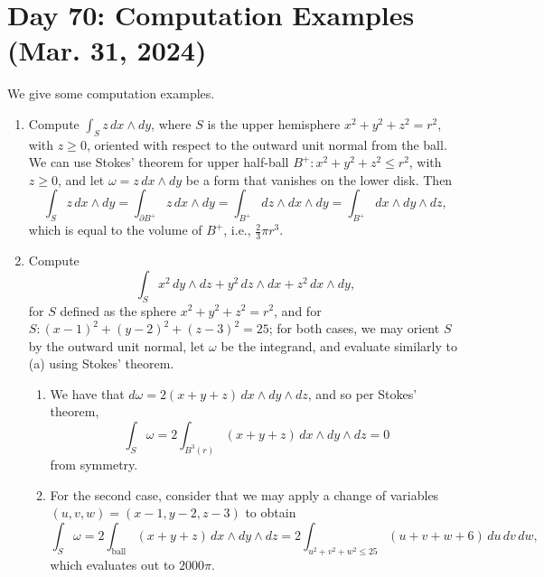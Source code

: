 \section{Day 70: Computation Examples (Mar. 31, 2024)}
We give some computation examples.
\begin{enumerate}[label=(\alph*)]
    \item Compute $\int_S z \, dx \wedge dy$, where $S$ is the upper hemisphere $x^2 + y^2 + z^2 = r^2$, with $z \geq 0$, oriented with respect to the outward unit normal from the ball. We can use Stokes' theorem for upper half-ball $B^+ : x^2 + y^2 + z^2 \leq r^2$, with $z \geq 0$, and let $\omega = z \, dx \wedge dy$ be a form that vanishes on the lower disk. Then
    \[ \int_S z \, dx \wedge dy = \int_{\partial B^+} z \, dx \wedge dy = \int_{B^+} dz \wedge dx \wedge dy = \int_{B^+} dx \wedge dy \wedge dz, \]
    which is equal to the volume of $B^+$, i.e., $\frac{2}{3} \pi r^3$.

    \item Compute
    \[ \int_S x^2 \, dy \wedge dz + y^2 \, dz \wedge dx + z^2 \, dx \wedge dy, \]
    for $S$ defined as the sphere $x^2 + y^2 + z^2 = r^2$, and for $S : (x-1)^2 + (y-2)^2 + (z-3)^2 = 25$; for both cases, we may orient $S$ by the outward unit normal, let $\omega$ be the integrand, and evaluate similarly to (a) using Stokes' theorem.
    \begin{enumerate}[label=(\roman*)]
        \item We have that $d\omega = 2(x + y + z) \, dx \wedge dy \wedge dz$, and so per Stokes' theorem,
        \[ \int_S \omega = 2 \int_{B^3(r)} (x + y + z) \, dx \wedge dy \wedge dz = 0 \]
        from symmetry.
        \item For the second case, consider that we may apply a change of variables $(u, v, w) = (x-1, y-2, z-3)$ to obtain
        \[ \int_S \omega = 2 \int_{\text{ball}} (x + y + z) \, dx \wedge dy \wedge dz = 2 \int_{u^2 + v^2 + w^2 \leq 25} (u + v + w + 6) \, du \, dv \, dw, \]
        which evaluates out to $2000\pi$.
    \end{enumerate}


\end{enumerate}
